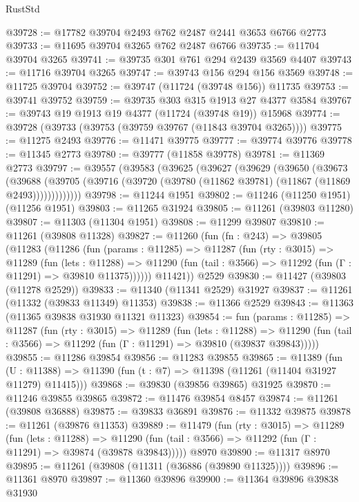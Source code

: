 \begin{lexlean}{RustStd}
\begin{coremodule}
@39728 := @17782 @39704 @2493 @762 @2487 @2441 @3653 @6766 @2773
@39733 := @11695 @39704 @3265 @762 @2487 @6766
@39735 := @11704 @39704 @3265
@39741 := @39735 @301 @761 @294 @2439 @3569 @4407
@39743 := @11716 @39704 @3265
@39747 := @39743 @156 @294 @156 @3569
@39748 := @11725 @39704
@39752 := @39747 (@11724 (@39748 @156)) @11735
@39753 := @39741 @39752
@39759 := @39735 @303 @315 @1913 @27 @4377 @3584
@39767 := @39743 @19 @1913 @19 @4377 (@11724 (@39748 @19)) @15968
@39774 := @39728 (@39733 (@39753 (@39759 @39767 (@11843 @39704 @3265))))
@39775 := @11275 @2493
@39776 := @11471 @39775
@39777 := @39774 @39776
@39778 := @11345 @2773
@39780 := @39777 (@11858 @39778)
@39781 := @11369 @2773
@39797 := @39557
    (@39583
      (@39625
        (@39627
          (@39629
            (@39650
              (@39673
                (@39688
                  (@39705 (@39716 (@39720 (@39780 (@11862 @39781) (@11867 (@11869 @2493)))))))))))))
@39798 := @11244 @1951
@39802 := @11246 (@11250 @1951) (@11256 @1951)
@39803 := @11265 @31924
@39805 := @11261 (@39803 @11280)
@39807 := @11303 (@11304 @1951)
@39808 := @11299 @39807
@39810 := @11261 (@39808 @11328)
@39827 := @11260
    (fun (fn : @243) =>
    @39805
      (@11283
        (@11286
          (fun (params : @11285) =>
          @11287
            (fun (rty : @3015) =>
            @11289
              (fun (lets : @11288) =>
              @11290 (fun (tail : @3566) => @11292 (fun (Γ : @11291) => @39810 @11375))))))
        @11421))
    @2529
@39830 := @11427 (@39803 (@11278 @2529))
@39833 := @11340 (@11341 @2529) @31927
@39837 := @11261 (@11332 (@39833 @11349) @11353)
@39838 := @11366 @2529
@39843 := @11363 (@11365 @39838 @31930 @11321 @11323)
@39854 := fun (params : @11285) =>
  @11287
    (fun (rty : @3015) =>
    @11289
      (fun (lets : @11288) =>
      @11290 (fun (tail : @3566) => @11292 (fun (Γ : @11291) => @39810 (@39837 @39843)))))
@39855 := @11286 @39854
@39856 := @11283 @39855
@39865 := @11389
    (fun (U : @11388) => @11390 (fun (t : @7) => @11398 (@11261 (@11404 @31927 @11279) @11415)))
@39868 := @39830 (@39856 @39865) @31925
@39870 := @11246 @39855 @39865
@39872 := @11476 @39854 @8457
@39874 := @11261 (@39808 @36888)
@39875 := @39833 @36891
@39876 := @11332 @39875
@39878 := @11261 (@39876 @11353)
@39889 := @11479
    (fun (rty : @3015) =>
    @11289
      (fun (lets : @11288) =>
      @11290 (fun (tail : @3566) => @11292 (fun (Γ : @11291) => @39874 (@39878 @39843)))))
    @8970
@39890 := @11317 @8970
@39895 := @11261 (@39808 (@11311 (@36886 (@39890 @11325))))
@39896 := @11361 @8970
@39897 := @11360 @39896
@39900 := @11364 @39896 @39838 @31930

\end{coremodule}
\end{lexlean}
